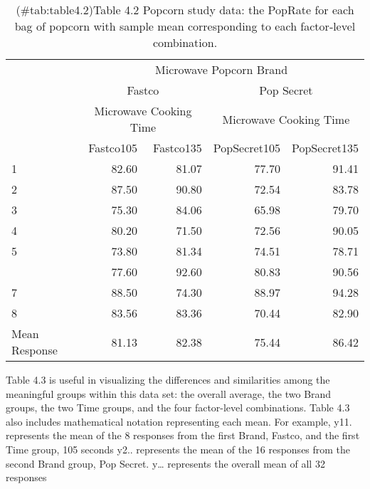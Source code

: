 \documentclass[
]{report}
\begin{document}
\begin{table}

\caption{(\#tab:table4.2)Table 4.2 Popcorn study data: the PopRate for each bag of popcorn with sample mean corresponding to each factor‐level combination.}
\centering
\begin{tabular}[t]{lrrrr}
\toprule
\multicolumn{1}{c}{ } & \multicolumn{4}{c}{Microwave Popcorn Brand} \\
\cmidrule(l{3pt}r{3pt}){2-5}
\multicolumn{1}{c}{ } & \multicolumn{2}{c}{Fastco} & \multicolumn{2}{c}{Pop Secret} \\
\cmidrule(l{3pt}r{3pt}){2-3} \cmidrule(l{3pt}r{3pt}){4-5}
\multicolumn{1}{c}{ } & \multicolumn{2}{c}{Microwave Cooking Time} & \multicolumn{2}{c}{Microwave Cooking Time} \\
\cmidrule(l{3pt}r{3pt}){2-3} \cmidrule(l{3pt}r{3pt}){4-5}
  & Fastco105 & Fastco135 & PopSecret105 & PopSecret135\\
\midrule
1 & 82.60 & 81.07 & 77.70 & 91.41\\
2 & 87.50 & 90.80 & 72.54 & 83.78\\
3 & 75.30 & 84.06 & 65.98 & 79.70\\
4 & 80.20 & 71.50 & 72.56 & 90.05\\
5 & 73.80 & 81.34 & 74.51 & 78.71\\
\addlinespace
6 & 77.60 & 92.60 & 80.83 & 90.56\\
7 & 88.50 & 74.30 & 88.97 & 94.28\\
8 & 83.56 & 83.36 & 70.44 & 82.90\\
Mean Response & 81.13 & 82.38 & 75.44 & 86.42\\
\bottomrule
\end{tabular}
\end{table}

Table 4.3 is useful in visualizing the differences and similarities among the meaningful groups within this
data set: the overall average, the two Brand groups, the two Time groups, and the four factor-level combinations. Table 4.3 also includes mathematical notation representing each mean. For example, y11. represents the
mean of the 8 responses from the first Brand, Fastco, and the first Time group, 105 seconds y2.. represents
the mean of the 16 responses from the second Brand group, Pop Secret. y\ldots{} represents the overall mean of
all 32 responses
\end{document}
